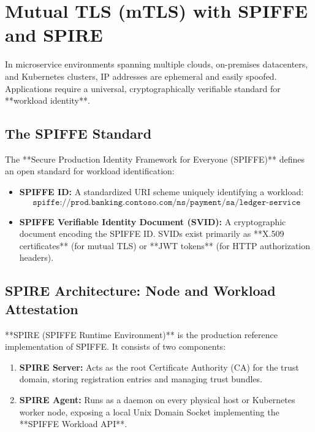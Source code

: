 \section{Mutual TLS (mTLS) with SPIFFE and SPIRE}

In microservice environments spanning multiple clouds, on-premises datacenters, and Kubernetes clusters, IP addresses are ephemeral and easily spoofed. Applications require a universal, cryptographically verifiable standard for **workload identity**.

\subsection{The SPIFFE Standard}
The **Secure Production Identity Framework for Everyone (SPIFFE)** defines an open standard for workload identification:
\begin{itemize}[leftmargin=12pt]
  \item \textbf{SPIFFE ID:} A standardized URI scheme uniquely identifying a workload:
  \begin{equation*}
  \texttt{spiffe://prod.banking.contoso.com/ns/payment/sa/ledger-service}
  \end{equation*}
  \item \textbf{SPIFFE Verifiable Identity Document (SVID):} A cryptographic document encoding the SPIFFE ID. SVIDs exist primarily as **X.509 certificates** (for mutual TLS) or **JWT tokens** (for HTTP authorization headers).
\end{itemize}

\subsection{SPIRE Architecture: Node and Workload Attestation}
**SPIRE (SPIFFE Runtime Environment)** is the production reference implementation of SPIFFE. It consists of two components:
\begin{enumerate}[leftmargin=15pt]
  \item \textbf{SPIRE Server:} Acts as the root Certificate Authority (CA) for the trust domain, storing registration entries and managing trust bundles.
  \item \textbf{SPIRE Agent:} Runs as a daemon on every physical host or Kubernetes worker node, exposing a local Unix Domain Socket implementing the **SPIFFE Workload API**.
\end{enumerate}

